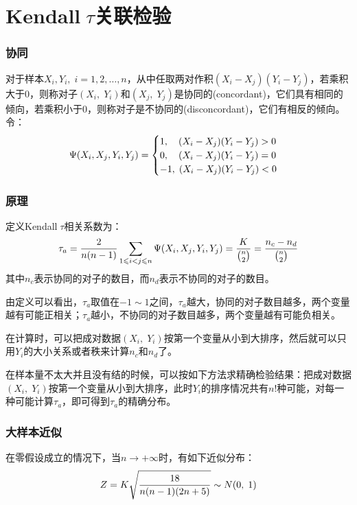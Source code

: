 \section{Kendall$\;\tau$关联检验}

\subsubsection{协同}
对于样本$X_i,Y_i,\;i=1,2,\dots,n$，从中任取两对作积$(X_i-X_j)(Y_i-Y_j)$，若乘积大于0，则称对子$(X_i,\;Y_i)$和$(X_j,\;Y_j)$是协同的(concordant)，它们具有相同的倾向，若乘积小于0，则称对子是不协同的(disconcordant)，它们有相反的倾向。令：
\begin{equation}
	\Psi(X_i,X_j,Y_i,Y_j)=
	\begin{cases}
		1,\quad(X_i-X_j)(Y_i-Y_j)>0 \\
		0,\quad(X_i-X_j)(Y_i-Y_j)=0 \\
		-1,\;(X_i-X_j)(Y_i-Y_j)<0 
	\end{cases}\notag
\end{equation}
\subsubsection{原理}
定义Kendall$\;\tau$相关系数为：
\begin{equation}
	\tau_a=\frac{2}{n(n-1)}\sum_{1\leqslant i<j\leqslant n}\Psi(X_i,X_j,Y_i,Y_j)=\frac{K}{\binom{n}{2}}=\frac{n_c-n_d}{\binom{n}{2}}\notag
\end{equation}
其中$n_c$表示协同的对子的数目，而$n_d$表示不协同的对子的数目。\par
由定义可以看出，$\tau_a$取值在$-1\sim 1$之间，$\tau_a$越大，协同的对子数目越多，两个变量越有可能正相关；$\tau_a$越小，不协同的对子数目越多，两个变量越有可能负相关。\par
在计算时，可以把成对数据$(X_i,\;Y_i)$按第一个变量从小到大排序，然后就可以只用$Y_i$的大小关系或者秩来计算$n_c$和$n_d$了。\par
在样本量不太大并且没有结的时候，可以按如下方法求精确检验结果：把成对数据$(X_i,\;Y_i)$按第一个变量从小到大排序，此时$Y_i$的排序情况共有$n!$种可能，对每一种可能计算$\tau_a$，即可得到$\tau_a$的精确分布。
\subsubsection{大样本近似}
在零假设成立的情况下，当$n\rightarrow +\infty$时，有如下近似分布：
\begin{equation}
	Z=K\sqrt{\frac{18}{n(n-1)(2n+5)}}\sim N(0,\;1)\notag
\end{equation}
